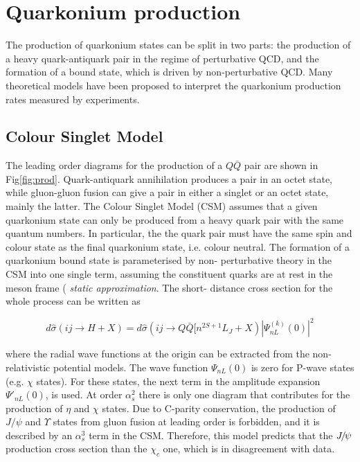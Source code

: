 \section{Quarkonium production}

The production of quarkonium states can be split in two parts: the production
of a heavy quark-antiquark pair in the regime of perturbative QCD, and the
formation of a bound state, which is driven by non-perturbative QCD. Many
theoretical models have been proposed to interpret the quarkonium production
rates measured by experiments.

\subsection{Colour Singlet Model}

The leading order diagrams for the production of a $Q\bar{Q}$ pair are shown in
Fig\ref{fig:prod}. Quark-antiquark annihilation produces a pair in an octet
state, while gluon-gluon fusion can give a  pair in either a singlet or an
octet state, mainly the latter. The Colour Singlet Model (CSM) \cite{CSM}
assumes that a given quarkonium state can only be produced from a heavy quark
pair with the same quantum numbers. In particular, the the quark pair must have
the same spin and colour state as the final quarkonium state, i.e. colour
neutral. The formation of a quarkonium bound state is parameterised by non-
perturbative theory in the CSM into one single term, assuming the constituent
quarks are at rest in the meson frame ({\it{ static approximation}}. The short-
distance cross section for the whole process can be written as

\begin{equation}
d{\hat{\sigma}}(ij\rightarrow H + X) = d{\hat{\sigma}}(ij\rightarrow Q{\bar{Q}}[n^{2S+1}L_J + X) 
|\Psi^{(k)}_{nL}(0)|^2
\end{equation}

\noindent where the radial wave functions at the origin can be extracted from
the non-relativistic potential models. The wave function $\Psi_{nL}(0)$ is zero
for P-wave states (e.g. $\chi$ states). For these states, the next term in the
amplitude expansion $\Psi'_{nL}(0)$, is used. At order $\alpha_s^2$ there is
only one diagram that contributes for the production of $\eta$ and $\chi$
states. Due to C-parity conservation, the production of $J/\psi$ and $\Upsilon$
states from gluon fusion at leading order is forbidden, and it is described by
an $\alpha_s^3$ term in the CSM. Therefore, this model predicts that the
${{J\mskip -3mu/\mskip -2mu\psi\mskip 2mu}}$ production cross section than the $\chi_c$ one, which is in
disagreement with data.

